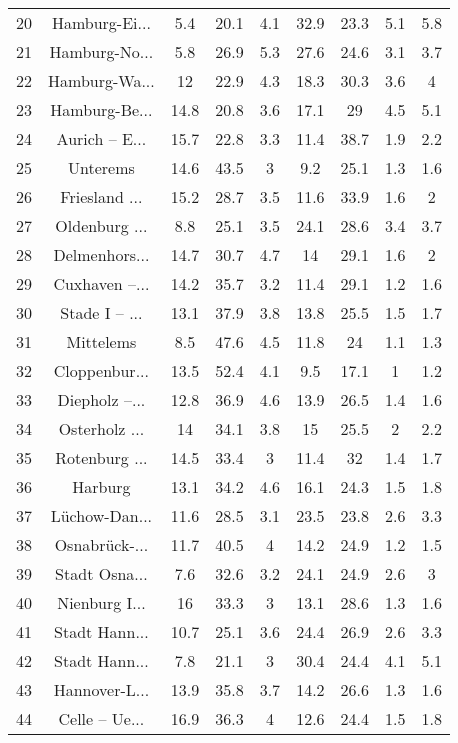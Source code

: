 \begin{table}[!htbp]
\begin{tabular}{@{\extracolsep{5pt}} ccccccccc}
20 & Hamburg-Ei... & 5.4 & 20.1 & 4.1 & 32.9 & 23.3 & 5.1 & 5.8 \\ 
21 & Hamburg-No... & 5.8 & 26.9 & 5.3 & 27.6 & 24.6 & 3.1 & 3.7 \\ 
22 & Hamburg-Wa... & 12 & 22.9 & 4.3 & 18.3 & 30.3 & 3.6 & 4 \\ 
23 & Hamburg-Be... & 14.8 & 20.8 & 3.6 & 17.1 & 29 & 4.5 & 5.1 \\ 
24 & Aurich – E... & 15.7 & 22.8 & 3.3 & 11.4 & 38.7 & 1.9 & 2.2 \\ 
25 & Unterems & 14.6 & 43.5 & 3 & 9.2 & 25.1 & 1.3 & 1.6 \\ 
26 & Friesland ... & 15.2 & 28.7 & 3.5 & 11.6 & 33.9 & 1.6 & 2 \\ 
27 & Oldenburg ... & 8.8 & 25.1 & 3.5 & 24.1 & 28.6 & 3.4 & 3.7 \\ 
28 & Delmenhors... & 14.7 & 30.7 & 4.7 & 14 & 29.1 & 1.6 & 2 \\ 
29 & Cuxhaven –... & 14.2 & 35.7 & 3.2 & 11.4 & 29.1 & 1.2 & 1.6 \\ 
30 & Stade I – ... & 13.1 & 37.9 & 3.8 & 13.8 & 25.5 & 1.5 & 1.7 \\ 
31 & Mittelems & 8.5 & 47.6 & 4.5 & 11.8 & 24 & 1.1 & 1.3 \\ 
32 & Cloppenbur... & 13.5 & 52.4 & 4.1 & 9.5 & 17.1 & 1 & 1.2 \\ 
33 & Diepholz –... & 12.8 & 36.9 & 4.6 & 13.9 & 26.5 & 1.4 & 1.6 \\ 
34 & Osterholz ... & 14 & 34.1 & 3.8 & 15 & 25.5 & 2 & 2.2 \\ 
35 & Rotenburg ... & 14.5 & 33.4 & 3 & 11.4 & 32 & 1.4 & 1.7 \\ 
36 & Harburg & 13.1 & 34.2 & 4.6 & 16.1 & 24.3 & 1.5 & 1.8 \\ 
37 & Lüchow-Dan... & 11.6 & 28.5 & 3.1 & 23.5 & 23.8 & 2.6 & 3.3 \\ 
38 & Osnabrück-... & 11.7 & 40.5 & 4 & 14.2 & 24.9 & 1.2 & 1.5 \\ 
39 & Stadt Osna... & 7.6 & 32.6 & 3.2 & 24.1 & 24.9 & 2.6 & 3 \\ 
40 & Nienburg I... & 16 & 33.3 & 3 & 13.1 & 28.6 & 1.3 & 1.6 \\ 
41 & Stadt Hann... & 10.7 & 25.1 & 3.6 & 24.4 & 26.9 & 2.6 & 3.3 \\ 
42 & Stadt Hann... & 7.8 & 21.1 & 3 & 30.4 & 24.4 & 4.1 & 5.1 \\ 
43 & Hannover-L... & 13.9 & 35.8 & 3.7 & 14.2 & 26.6 & 1.3 & 1.6 \\ 
44 & Celle – Ue... & 16.9 & 36.3 & 4 & 12.6 & 24.4 & 1.5 & 1.8 \\ 

\end{tabular}
\end{table}
